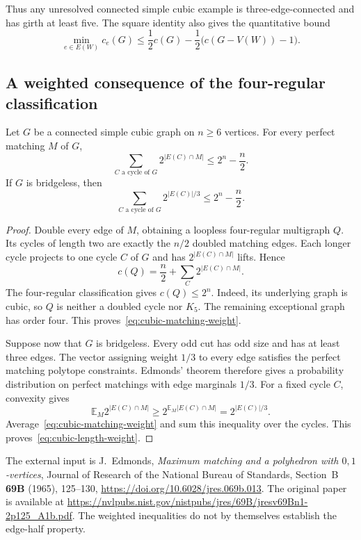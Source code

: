 Thus any unresolved connected simple cubic example is three-edge-connected and has girth at least five.
The square identity also gives the quantitative bound
\[
 \min_{e\in E(W)}c_e(G)
 \le\frac12c(G)-\frac12\bigl(c(G-V(W))-1\bigr).
\]

\subsection{A weighted consequence of the four-regular classification}

\begin{proposition}\label{prop:cubic-matching-weight}
Let $G$ be a connected simple cubic graph on $n\ge6$ vertices.
For every perfect matching $M$ of $G$,
\begin{equation}\label{eq:cubic-matching-weight}
 \sum_{C\text{ a cycle of }G}2^{|E(C)\cap M|}\le2^n-\frac n2.
\end{equation}
If $G$ is bridgeless, then
\begin{equation}\label{eq:cubic-length-weight}
 \sum_{C\text{ a cycle of }G}2^{|E(C)|/3}\le2^n-\frac n2.
\end{equation}
\end{proposition}

\begin{proof}
Double every edge of $M$, obtaining a loopless four-regular multigraph $Q$.
Its cycles of length two are exactly the $n/2$ doubled matching edges.
Each longer cycle projects to one cycle $C$ of $G$ and has $2^{|E(C)\cap M|}$ lifts.
Hence
\[
 c(Q)=\frac n2+\sum_C2^{|E(C)\cap M|}.
\]
The four-regular classification gives $c(Q)\le2^n$.
Indeed, its underlying graph is cubic, so $Q$ is neither a doubled cycle nor $K_5$.
The remaining exceptional graph has order four.
This proves~\eqref{eq:cubic-matching-weight}.

Suppose now that $G$ is bridgeless.
Every odd cut has odd size and has at least three edges.
The vector assigning weight $1/3$ to every edge satisfies the perfect matching polytope constraints.
Edmonds' theorem therefore gives a probability distribution on perfect matchings with edge marginals $1/3$.
For a fixed cycle $C$, convexity gives
\[
 \mathbb E_M 2^{|E(C)\cap M|}
 \ge2^{\mathbb E_M|E(C)\cap M|}=2^{|E(C)|/3}.
\]
Average~\eqref{eq:cubic-matching-weight} and sum this inequality over the cycles.
This proves~\eqref{eq:cubic-length-weight}.
\end{proof}

The external input is J.~Edmonds, \emph{Maximum matching and a polyhedron with $0,1$-vertices},
Journal of Research of the National Bureau of Standards, Section~B \textbf{69B} (1965), 125--130,
\url{https://doi.org/10.6028/jres.069b.013}.
The original paper is available at
\url{https://nvlpubs.nist.gov/nistpubs/jres/69B/jresv69Bn1-2p125_A1b.pdf}.
The weighted inequalities do not by themselves establish the edge-half property.

